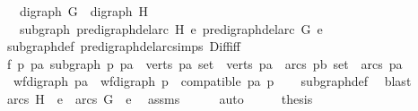 \begin{isabellebody}
\ \ \ {\isachardoublequoteopen}digraph\ G\ {\isasymand}\ digraph\ H{\isachardoublequoteclose}\isanewline
\ \ \ {\isachardoublequoteopen}subgraph\ {\isacharparenleft}{\kern0pt}pre{\isacharunderscore}{\kern0pt}digraph{\isachardot}{\kern0pt}del{\isacharunderscore}{\kern0pt}arc\ H\ e{}{\isacharparenright}{\kern0pt}\ {\isacharparenleft}{\kern0pt}pre{\isacharunderscore}{\kern0pt}digraph{\isachardot}{\kern0pt}del{\isacharunderscore}{\kern0pt}arc\ G\ e{}{\isacharparenright}{\kern0pt}{\isachardoublequoteclose}\isanewline
%
\isadelimproof
\ \ %
\endisadelimproof
%
\isatagproof
{}\isamarkupfalse%
\ subgraph{\isacharunderscore}{\kern0pt}def\ pre{\isacharunderscore}{\kern0pt}digraph{\isachardot}{\kern0pt}del{\isacharunderscore}{\kern0pt}arc{\isacharunderscore}{\kern0pt}simps\ Diff{\isacharunderscore}{\kern0pt}iff\isanewline
{}\isamarkupfalse%
\ {\isacharminus}{\kern0pt}\isanewline
\ \ \isamarkupfalse%
\ f{}{\isacharcolon}{\kern0pt}\ {\isachardoublequoteopen}{\isasymforall}p\ pa{\isachardot}{\kern0pt}\ subgraph\ p\ pa\ {\isacharequal}{\kern0pt}\ {\isacharparenleft}{\kern0pt}{\isacharparenleft}{\kern0pt}verts\ p{\isacharcolon}{\kern0pt}{\isacharcolon}{\kern0pt}{\isacharprime}{\kern0pt}a\ set{\isacharparenright}{\kern0pt}\ {\isasymsubseteq}\ verts\ pa\ {\isasymand}\ {\isacharparenleft}{\kern0pt}arcs\ p{\isacharcolon}{\kern0pt}{\isacharcolon}{\kern0pt}{\isacharprime}{\kern0pt}b\ set{\isacharparenright}{\kern0pt}\ {\isasymsubseteq}\ arcs\ pa\ {\isasymand}\ \isanewline
\ \ wf{\isacharunderscore}{\kern0pt}digraph\ pa\ {\isasymand}\ wf{\isacharunderscore}{\kern0pt}digraph\ p\ {\isasymand}\ compatible\ pa\ p{\isacharparenright}{\kern0pt}{\isachardoublequoteclose}\isanewline
\ \ \isamarkupfalse%
\ subgraph{\isacharunderscore}{\kern0pt}def\ \isamarkupfalse%
\ blast\isanewline
\ \ \isamarkupfalse%
\ {\isachardoublequoteopen}arcs\ H\ {\isacharminus}{\kern0pt}\ {\isacharbraceleft}{\kern0pt}e{}{\isacharbraceright}{\kern0pt}\ {\isasymsubseteq}\ arcs\ G\ {\isacharminus}{\kern0pt}\ {\isacharbraceleft}{\kern0pt}e{}{\isacharbraceright}{\kern0pt}{\isachardoublequoteclose}\ \isamarkupfalse%
\ assms{\isacharparenleft}{\kern0pt}{}{\isacharparenright}{\kern0pt}\isanewline
\ \ \ \ \isamarkupfalse%
\ auto\isanewline
\ \ \isamarkupfalse%
\ \isamarkupfalse%
\ {\isacharquery}{\kern0pt}thesis\isanewline
\ \ \ \ \isamarkupfalse%

\end{isabellebody}
